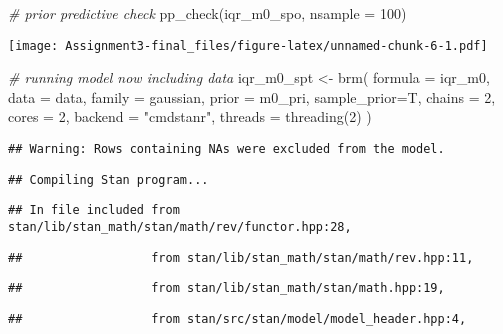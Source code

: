 \documentclass[
]{article}
\newenvironment{Shaded}{\begin{snugshade}}{\end{snugshade}}
\newcommand{\AttributeTok}[1]{\textcolor[rgb]{0.77,0.63,0.00}{#1}}
\newcommand{\CommentTok}[1]{\textcolor[rgb]{0.56,0.35,0.01}{\textit{#1}}}
\newcommand{\DecValTok}[1]{\textcolor[rgb]{0.00,0.00,0.81}{#1}}
\newcommand{\FunctionTok}[1]{\textcolor[rgb]{0.00,0.00,0.00}{#1}}
\newcommand{\NormalTok}[1]{#1}
\newcommand{\OtherTok}[1]{\textcolor[rgb]{0.56,0.35,0.01}{#1}}
\newcommand{\StringTok}[1]{\textcolor[rgb]{0.31,0.60,0.02}{#1}}
\begin{document}
\begin{Shaded}
\begin{Highlighting}[]
\CommentTok{\# prior predictive check}
\FunctionTok{pp\_check}\NormalTok{(iqr\_m0\_spo, }\AttributeTok{nsample =} \DecValTok{100}\NormalTok{)}
\end{Highlighting}
\end{Shaded}

\texttt{[image: Assignment3-final\_files/figure-latex/unnamed-chunk-6-1.pdf]}

\begin{Shaded}
\begin{Highlighting}[]
\CommentTok{\# running model now including data}
\NormalTok{iqr\_m0\_spt }\OtherTok{\textless{}{-}} \FunctionTok{brm}\NormalTok{(}
  \AttributeTok{formula =}\NormalTok{ iqr\_m0,}
  \AttributeTok{data =}\NormalTok{ data,}
  \AttributeTok{family =}\NormalTok{ gaussian,}
  \AttributeTok{prior =}\NormalTok{ m0\_pri,}
  \AttributeTok{sample\_prior=}\NormalTok{T,}
  \AttributeTok{chains =} \DecValTok{2}\NormalTok{,}
  \AttributeTok{cores =} \DecValTok{2}\NormalTok{,}
  \AttributeTok{backend =} \StringTok{"cmdstanr"}\NormalTok{,}
  \AttributeTok{threads =} \FunctionTok{threading}\NormalTok{(}\DecValTok{2}\NormalTok{)}
\NormalTok{)}
\end{Highlighting}
\end{Shaded}

\begin{verbatim}
## Warning: Rows containing NAs were excluded from the model.
\end{verbatim}

\begin{verbatim}
## Compiling Stan program...
\end{verbatim}

\begin{verbatim}
## In file included from stan/lib/stan_math/stan/math/rev/functor.hpp:28,
\end{verbatim}

\begin{verbatim}
##                  from stan/lib/stan_math/stan/math/rev.hpp:11,
\end{verbatim}

\begin{verbatim}
##                  from stan/lib/stan_math/stan/math.hpp:19,
\end{verbatim}

\begin{verbatim}
##                  from stan/src/stan/model/model_header.hpp:4,
\end{verbatim}
\end{document}
